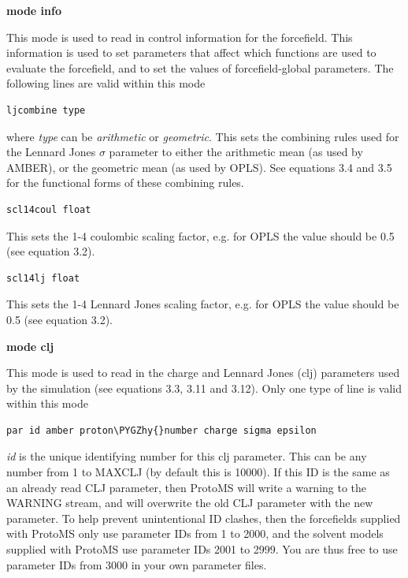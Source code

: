\documentclass[letterpaper,10pt,english]{sphinxmanual}
\def\PYGZhy{\char`\-}
\begin{document}
\textbf{mode info}

This mode is used to read in control information for the forcefield. This information is used to set parameters that affect which functions are used to evaluate the forcefield, and to set the values of forcefield-global parameters. The following lines are valid within this mode

\begin{Verbatim}[commandchars=\\\{\}]
ljcombine type
\end{Verbatim}

where \emph{type} can be \emph{arithmetic} or \emph{geometric}. This sets the combining rules used for the Lennard Jones \(\sigma\) parameter to either the arithmetic mean (as used by AMBER), or the geometric mean (as used by OPLS). See equations 3.4 and 3.5 for the functional forms of these combining rules.

\begin{Verbatim}[commandchars=\\\{\}]
scl14coul float
\end{Verbatim}

This sets the 1-4 coulombic scaling factor, e.g. for OPLS the value should be 0.5 (see equation 3.2).

\begin{Verbatim}[commandchars=\\\{\}]
scl14lj float
\end{Verbatim}

This sets the 1-4 Lennard Jones scaling factor, e.g. for OPLS the value should be 0.5 (see equation 3.2).

\textbf{mode clj}

This mode is used to read in the charge and Lennard Jones (clj) parameters used by the simulation (see equations 3.3, 3.11 and 3.12). Only one type of line is valid within this mode

\begin{Verbatim}[commandchars=\\\{\}]
par id amber proton\PYGZhy{}number charge sigma epsilon
\end{Verbatim}

\emph{id} is the unique identifying number for this clj parameter. This can be any number from 1 to MAXCLJ (by default this is 10000). If this ID is the same as an already read CLJ parameter, then ProtoMS will write a warning to the WARNING stream, and will overwrite the old CLJ parameter with the new parameter. To help prevent unintentional ID clashes, then the forcefields supplied with ProtoMS only use parameter IDs from 1 to 2000, and the solvent models supplied with ProtoMS use parameter IDs 2001 to 2999. You are thus free to use parameter IDs from 3000 in your own parameter files.
\end{document}
